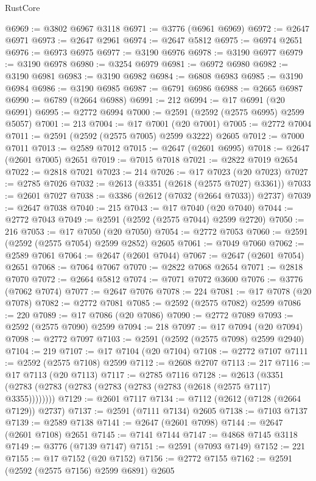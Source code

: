 \begin{lexlean}{RustCore}
\begin{coremodule}
@6969 := @3802 @6967 @3118
@6971 := @3776 (@6961 @6969)
@6972 := @2647 @6971
@6973 := @2647 @2961
@6974 := @2647 @5812
@6975 := @6974 @2651
@6976 := @6973 @6975
@6977 := @3190 @6976
@6978 := @3190 @6977
@6979 := @3190 @6978
@6980 := @3254 @6979
@6981 := @6972 @6980
@6982 := @3190 @6981
@6983 := @3190 @6982
@6984 := @6808 @6983
@6985 := @3190 @6984
@6986 := @3190 @6985
@6987 := @6791 @6986
@6988 := @2665 @6987
@6990 := @6789 (@2664 @6988)
@6991 := 212
@6994 := @17 @6991 (@20 @6991)
@6995 := @2772 @6994
@7000 := @2591 (@2592 (@2575 @6995) @2599 @5057)
@7001 := 213
@7004 := @17 @7001 (@20 @7001)
@7005 := @2772 @7004
@7011 := @2591 (@2592 (@2575 @7005) @2599 @3222) @2605
@7012 := @7000 @7011
@7013 := @2589 @7012
@7015 := @2647 (@2601 @6995)
@7018 := @2647 (@2601 @7005) @2651
@7019 := @7015 @7018
@7021 := @2822 @7019 @2654
@7022 := @2818 @7021
@7023 := 214
@7026 := @17 @7023 (@20 @7023)
@7027 := @2785 @7026
@7032 := @2613 (@3351 (@2618 (@2575 @7027) @3361))
@7033 := @2601 @7027
@7038 := @3386 (@2612 (@7032 (@2664 @7033)) @2737)
@7039 := @2647 @7038
@7040 := 215
@7043 := @17 @7040 (@20 @7040)
@7044 := @2772 @7043
@7049 := @2591 (@2592 (@2575 @7044) @2599 @2720)
@7050 := 216
@7053 := @17 @7050 (@20 @7050)
@7054 := @2772 @7053
@7060 := @2591 (@2592 (@2575 @7054) @2599 @2852) @2605
@7061 := @7049 @7060
@7062 := @2589 @7061
@7064 := @2647 (@2601 @7044)
@7067 := @2647 (@2601 @7054) @2651
@7068 := @7064 @7067
@7070 := @2822 @7068 @2654
@7071 := @2818 @7070
@7072 := @2664 @5812
@7074 := @7071 @7072 @3600
@7076 := @3776 (@7062 @7074)
@7077 := @2647 @7076
@7078 := 224
@7081 := @17 @7078 (@20 @7078)
@7082 := @2772 @7081
@7085 := @2592 (@2575 @7082) @2599
@7086 := 220
@7089 := @17 @7086 (@20 @7086)
@7090 := @2772 @7089
@7093 := @2592 (@2575 @7090) @2599
@7094 := 218
@7097 := @17 @7094 (@20 @7094)
@7098 := @2772 @7097
@7103 := @2591 (@2592 (@2575 @7098) @2599 @2940)
@7104 := 219
@7107 := @17 @7104 (@20 @7104)
@7108 := @2772 @7107
@7111 := @2592 (@2575 @7108) @2599
@7112 := @2608 @2707
@7113 := 217
@7116 := @17 @7113 (@20 @7113)
@7117 := @2785 @7116
@7128 := @2613 (@3351 (@2783 (@2783 (@2783 (@2783 (@2783 (@2783 (@2618 (@2575 @7117) @3355))))))))
@7129 := @2601 @7117
@7134 := @7112 (@2612 (@7128 (@2664 @7129)) @2737)
@7137 := @2591 (@7111 @7134) @2605
@7138 := @7103 @7137
@7139 := @2589 @7138
@7141 := @2647 (@2601 @7098)
@7144 := @2647 (@2601 @7108) @2651
@7145 := @7141 @7144
@7147 := @4868 @7145 @3118
@7149 := @3776 (@7139 @7147)
@7151 := @2591 (@7093 @7149)
@7152 := 221
@7155 := @17 @7152 (@20 @7152)
@7156 := @2772 @7155
@7162 := @2591 (@2592 (@2575 @7156) @2599 @6891) @2605

\end{coremodule}
\end{lexlean}
